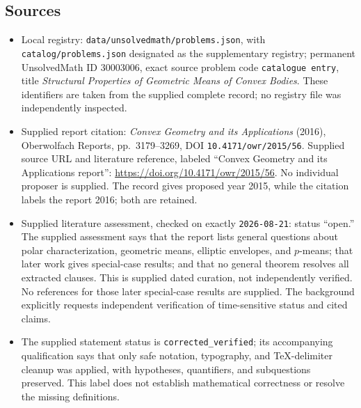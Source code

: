 \documentclass[11pt]{article}
\begin{document}
\subsection{Sources}
\begin{itemize}
\item Local registry: \texttt{data/unsolvedmath/problems.json}, with \texttt{catalog/problems.json} designated as the supplementary registry; permanent UnsolvedMath ID \(30003006\), exact source problem code \texttt{catalogue entry}, title \emph{Structural Properties of Geometric Means of Convex Bodies}. These identifiers are taken from the supplied complete record; no registry file was independently inspected.
\item Supplied report citation: \emph{Convex Geometry and its Applications} (2016), Oberwolfach Reports, pp.\ 3179--3269, DOI \texttt{10.4171/owr/2015/56}. Supplied source URL and literature reference, labeled ``Convex Geometry and its Applications report'': \url{https://doi.org/10.4171/owr/2015/56}. No individual proposer is supplied. The record gives proposed year 2015, while the citation labels the report 2016; both are retained.
\item Supplied literature assessment, checked on exactly \texttt{2026-08-21}: status ``open.'' The supplied assessment says that the report lists general questions about polar characterization, geometric means, elliptic envelopes, and \(p\)-means; that later work gives special-case results; and that no general theorem resolves all extracted clauses. This is supplied dated curation, not independently verified. No references for those later special-case results are supplied. The background explicitly requests independent verification of time-sensitive status and cited claims.
\item The supplied statement status is \texttt{corrected\_verified}; its accompanying qualification says that only safe notation, typography, and TeX-delimiter cleanup was applied, with hypotheses, quantifiers, and subquestions preserved. This label does not establish mathematical correctness or resolve the missing definitions.
\end{itemize}
\end{document}
